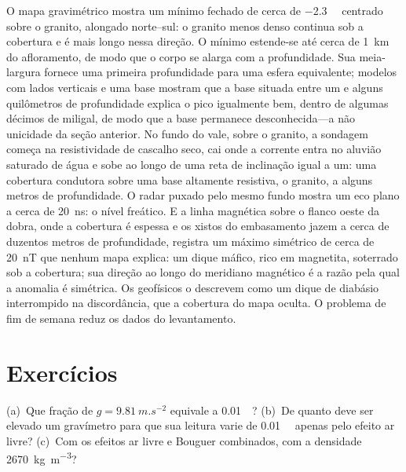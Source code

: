\begin{example}\label{ex:b3:field-lab-methods-3:varden}
O mapa gravimétrico mostra um mínimo fechado de cerca de \qty{-2.3}{\milli\gal}
centrado sobre o granito, alongado norte--sul: o granito menos denso
continua sob a cobertura e é mais longo nessa direção. O mínimo
estende-se até cerca de \qty{1}{km} do afloramento, de modo que o corpo se alarga com
a profundidade. Sua meia-largura fornece uma primeira profundidade para uma esfera equivalente;
modelos com lados verticais e uma base mostram que a base situada entre um
e alguns quilômetros de profundidade explica o pico igualmente bem, dentro de algumas
décimos de miligal, de modo que a base permanece desconhecida---a não unicidade
da seção anterior. No fundo do vale, sobre o granito, a
sondagem começa na resistividade de cascalho seco, cai onde a
corrente entra no aluvião saturado de água e sobe ao longo de uma reta
de inclinação igual a um: uma cobertura condutora sobre uma base altamente resistiva, o
granito, a alguns metros de profundidade. O radar puxado pelo mesmo fundo mostra um
eco plano a cerca de \qty{20}{ns}: o nível freático. E a linha magnética
sobre o flanco oeste da dobra, onde a cobertura é espessa e os
xistos do embasamento jazem a cerca de duzentos metros de profundidade, registra um
máximo simétrico de cerca de \qty{20}{nT} que nenhum mapa explica: um dique máfico,
rico em magnetita, soterrado sob a cobertura; sua direção ao longo do
meridiano magnético é a razão pela qual a anomalia é simétrica. Os geofísicos
o descrevem como um dique de diabásio interrompido na discordância, que a
cobertura do mapa oculta. O problema de fim de semana reduz os dados do
levantamento.
\end{example}

\section*{Exercícios}

\begin{exercise}[$\star$]\label{exo:b3:field-lab-methods-3:1}
(a)~Que fração de $g = \qty{9.81}{m.s^{-2}}$ equivale a \qty{0.01}{\milli\gal}?
(b)~De quanto deve ser elevado um gravímetro para que sua leitura varie
de \qty{0.01}{\milli\gal} apenas pelo efeito ar livre? (c)~Com os efeitos ar livre e
Bouguer combinados, com a densidade
\qty{2670}{kg.m^{-3}}?
\end{exercise}


